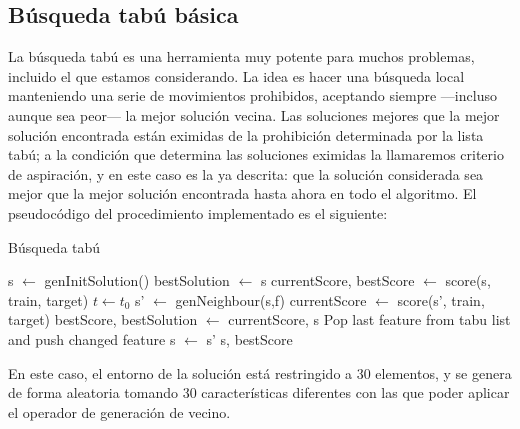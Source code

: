 \documentclass[a4paper, 11pt, titlepage]{article}
\begin{document}
    \subsection{Búsqueda tabú básica}


    La búsqueda tabú es una herramienta muy potente para muchos problemas, incluido el que estamos considerando. La idea es hacer una búsqueda local manteniendo una serie de movimientos prohibidos, aceptando siempre ---incluso aunque sea peor--- la mejor solución vecina. Las soluciones mejores que la mejor solución encontrada están eximidas de la prohibición determinada por la lista tabú; a la condición que determina las soluciones eximidas la llamaremos criterio de aspiración, y en este caso es la ya descrita: que la solución considerada sea mejor que la mejor solución encontrada hasta ahora en todo el algoritmo.  El pseudocódigo del procedimiento implementado es el siguiente:
    \begin{algorithm}
        \caption{Búsqueda tabú}\label{enfSimul}
        \begin{algorithmic}[1]
            \State s $\gets$ genInitSolution()
            \State bestSolution $\gets$ s
            \State currentScore, bestScore $\gets$ score(s, train, target)
            \State $t \gets t_0$
                 
                    \State s' $\gets$ genNeighbour(s,f)
                    \State currentScore $\gets$ score(s', train, target)
                         
                        \State bestScore, bestSolution $\gets$ currentScore, s
                        \EndIf
                     
                    \EndIf
                \EndFor
                \State Pop last feature from tabu list and push changed feature
                \State s $\gets$ s'
                \EndIf
            \EndWhile
            \State \Return s, bestScore
            \EndFunction
        \end{algorithmic}
    \end{algorithm}

    En este caso, el entorno de la solución está restringido a 30 elementos, y se genera de forma aleatoria tomando 30 características diferentes con las que poder aplicar el operador de generación de vecino.
\end{document}
